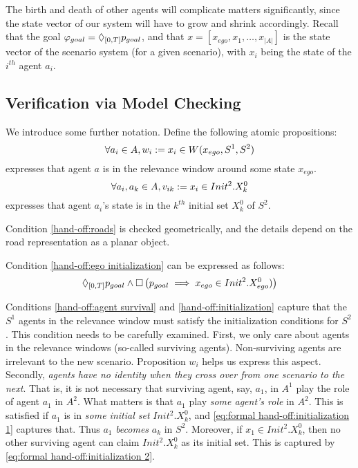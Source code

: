 The birth and death of other agents will complicate matters significantly, since the state vector of our system will have to grow and shrink accordingly.
Recall that the goal $\varphi_{goal} = \Diamond_{[0,T]}p_{goal}$, and that $x = [x_{ego}, x_1, \ldots,x_{|A|}]$ is the state vector of the scenario system (for a given scenario), with $x_i$ being the state of the $i^{th}$ agent $a_i$.

\subsection{Verification via Model Checking}
We introduce some further notation.
Define the following atomic propositions:
\[\forall a_i \in A, w_i := x_i \in W(x_{ego}, S^1,S^2)\]
expresses that agent $a$ is in the relevance window around some state $x_{ego}$.
\[\forall a_i,a_k \in A, v_{ik} := x_i \in Init^2.X_k^0\]
expresses that agent $a_i$'s state is in the $k^{th}$ initial set $X_k^0$ of $S^2$.

Condition \ref{hand-off:roads} is checked geometrically, and the details depend on the road representation as a planar object.

Condition \ref{hand-off:ego initialization} can be expressed as follows:
\begin{equation}
\label{eq:formal hand-off:ego initialization}
\Diamond_{[0,T]} p_{goal} \wedge \square \left(p_{goal} \implies x_{ego} \in Init^2.X_{ego}^0)\right)
\end{equation}

Conditions \ref{hand-off:agent survival} and \ref{hand-off:initialization} capture that the $S^1$ agents in the relevance window must satisfy the initialization conditions for $S^2$.
This condition needs to be carefully examined.
First, we only care about agents in the relevance windows (so-called surviving agents). 
Non-surviving agents are irrelevant to the new scenario. 
Proposition $w_i$ helps us express this aspect.
Secondly, \emph{agents have no identity when they cross over from one scenario to the next}. 
That is, it is not necessary that surviving agent, say, $a_1$, in $A^1$ play the role of agent $a_1$ in $A^2$. 
What matters is that $a_1$ play \emph{some agent's role} in $A^2$. 
This is satisfied if $a_1$ is in \emph{some initial set} $Init^2.X_k^0$, and \eqref{eq:formal hand-off:initialization 1} captures that.
Thus $a_1$ \emph{becomes} $a_k$ in $S^2$.
Moreover, if $x_1 \in Init^2.X_k^0$, then no other surviving agent can claim $Init^2.X_k^0$ as its initial set. 
This is captured by \eqref{eq:formal hand-off:initialization 2}.


